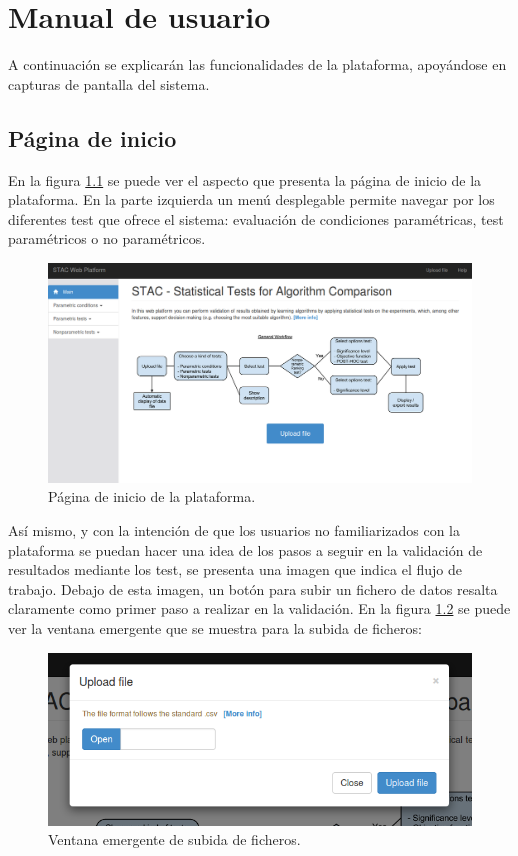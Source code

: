 \chapter{Manual de usuario}

A continuación se explicarán las funcionalidades de la plataforma, apoyándose en capturas de pantalla del sistema.

\section{Página de inicio}

En la figura \ref{fig:man_inicio} se puede ver el aspecto que presenta la página de inicio de la plataforma. En la parte izquierda un menú desplegable permite navegar por los diferentes test que ofrece el sistema: evaluación de condiciones paramétricas, test paramétricos o no paramétricos.

\begin{figure}[H]
\centering
\includegraphics[scale=0.4]{figuras/man_inicio.png}
\caption{Página de inicio de la plataforma.}
\label{fig:man_inicio}
\end{figure}

Así mismo, y con la intención de que los usuarios no familiarizados con la plataforma se puedan hacer una idea de los pasos a seguir en la validación de resultados mediante los test, se presenta una imagen que indica el flujo de trabajo. Debajo de esta imagen, un botón para subir un fichero de datos resalta claramente como primer paso a realizar en la validación. En la figura \ref{fig:man_fichero} se puede ver la ventana emergente que se muestra para la subida de ficheros:

\begin{figure}[H]
\centering
\includegraphics[scale=0.5]{figuras/man_fichero.png}
\caption{Ventana emergente de subida de ficheros.}
\label{fig:man_fichero}
\end{figure}

